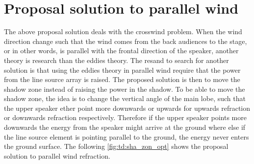 





\section{Proposal solution to parallel wind}\label{sec:des:pro_para}
The above proposal solution deals with the crosswind problem. When the wind direction change such that the wind comes from the back audiences to the stage, or in other words, is parallel with the frontal direction of the speaker, another theory is research than the eddies theory. The resand to search for another solution is that using the eddies theory in parallel wind require that the power from the line source array is raised. The proposed solution is then to move the shadow zone instead of raising the power in the shadow. To be able to move the shadow zone, the idea is to change the vertical angle of the main lobe, such that the upper speaker ether point more downwards or upwards for upwards refraction or downwards refraction respectively. Therefore if the upper speaker points more downwards the energy from the speaker might arrive at the ground where else if the line source element is pointing parallel to the ground, the energy never enters the ground surface. The following \autoref{fig:td:sha_zon_opt} shows the proposal solution to parallel wind refraction.  


